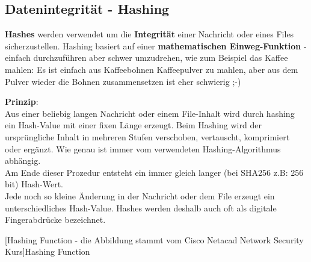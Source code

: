 \documentclass[10pt,a4paper,titlepage]{paper}
\begin{document}
\newpage
\subsection{Datenintegrität - Hashing} \label{hash}
\textbf{Hashes} werden verwendet um die \textbf{Integrität} einer Nachricht oder eines Files sicherzustellen. Hashing basiert auf einer \textbf{mathematischen Einweg-Funktion} - einfach durchzuführen aber schwer umzudrehen, wie zum Beispiel das Kaffee mahlen: Es ist einfach aus Kaffeebohnen Kaffeepulver zu mahlen, aber aus dem Pulver wieder die Bohnen zusammensetzen ist eher schwierig ;-)\\
\begin{minipage}{6.7cm}
\textbf{Prinzip}:\\Aus einer beliebig langen Nachricht oder einem File-Inhalt wird durch hashing ein Hash-Value mit einer fixen Länge erzeugt.
Beim Hashing wird der ursprüngliche Inhalt in mehreren Stufen verschoben, vertauscht, komprimiert oder ergänzt. Wie genau ist immer vom verwendeten Hashing-Algorithmus abhängig.\\
Am Ende dieser Prozedur entsteht ein immer gleich langer (bei SHA256 z.B: 256 bit) Hash-Wert.\\ Jede noch so kleine Änderung in der Nachricht oder dem File erzeugt ein unterschiedliches Hash-Value. Hashes werden deshalb auch oft als digitale Fingerabdrücke bezeichnet. 
\end{minipage}
\begin{minipage}{8cm}
\begin{center}

[Hashing Function - die Abbildung stammt vom Cisco Netacad Network Security Kurs]{Hashing Function}

\end{center}
\end{minipage}
\end{document}
